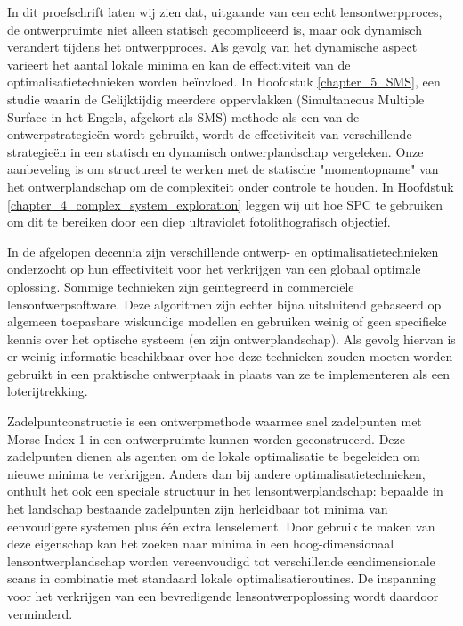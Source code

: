 {%
In dit proefschrift laten wij zien dat, uitgaande van een echt lensontwerpproces, de ontwerpruimte niet alleen statisch gecompliceerd is, maar ook dynamisch verandert tijdens het ontwerpproces. Als gevolg van het dynamische aspect varieert het aantal lokale minima en kan de effectiviteit van de optimalisatietechnieken worden beïnvloed. In Hoofdstuk \ref{chapter_5_SMS}, een studie waarin de Gelijktijdig meerdere oppervlakken (Simultaneous Multiple Surface in het Engels, afgekort als SMS) methode als een van de ontwerpstrategieën wordt gebruikt, wordt de effectiviteit van verschillende strategieën in een statisch en dynamisch ontwerplandschap vergeleken. Onze aanbeveling is om structureel te werken met de statische "momentopname" van het ontwerplandschap om de complexiteit onder controle te houden. In Hoofdstuk \ref{chapter_4_complex_system_exploration} leggen wij uit hoe SPC te gebruiken om dit te bereiken door een diep ultraviolet fotolithografisch objectief.

In de afgelopen decennia zijn verschillende ontwerp- en optimalisatietechnieken onderzocht op hun effectiviteit voor het verkrijgen van een globaal optimale oplossing. Sommige technieken zijn geïntegreerd in commerciële lensontwerpsoftware. Deze algoritmen zijn echter bijna uitsluitend gebaseerd op algemeen toepasbare wiskundige modellen en gebruiken weinig of geen specifieke kennis over het optische systeem (en zijn ontwerplandschap). Als gevolg hiervan is er weinig informatie beschikbaar over hoe deze technieken zouden moeten worden gebruikt in een praktische ontwerptaak in plaats van ze te implementeren als een loterijtrekking.

Zadelpuntconstructie is een ontwerpmethode waarmee snel zadelpunten met Morse Index 1 in een ontwerpruimte kunnen worden geconstrueerd. Deze zadelpunten dienen als agenten om de lokale optimalisatie te begeleiden om nieuwe minima te verkrijgen. Anders dan bij andere optimalisatietechnieken, onthult het ook een speciale structuur in het lensontwerplandschap: bepaalde in het landschap bestaande zadelpunten zijn herleidbaar tot minima van eenvoudigere systemen plus één extra lenselement. Door gebruik te maken van deze eigenschap kan het zoeken naar minima in een hoog-dimensionaal lensontwerplandschap worden vereenvoudigd tot verschillende eendimensionale scans in combinatie met standaard lokale optimalisatieroutines. De inspanning voor het verkrijgen van een bevredigende lensontwerpoplossing wordt daardoor verminderd.

}
